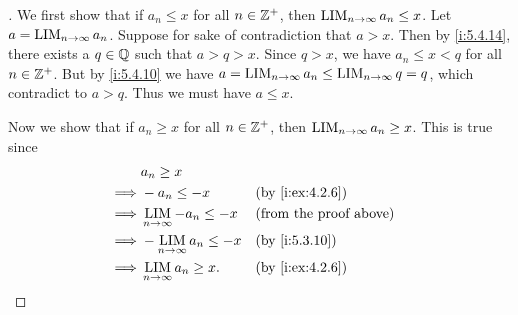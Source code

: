 \begin{proof}[]
  We first show that if \(a_n \leq x\) for all \(n \in \mathbb{Z}^+\), then \(\operatorname*{LIM}_{n \to \infty} a_n \leq x\).
  Let \(a = \operatorname*{LIM}_{n \to \infty} a_n\).
  Suppose for sake of contradiction that \(a > x\).
  Then by \cref{i:5.4.14}, there exists a \(q \in \mathbb{Q}\) such that \(a > q > x\).
  Since \(q > x\), we have \(a_n \leq x < q\) for all \(n \in \mathbb{Z}^+\).
  But by \cref{i:5.4.10} we have \(a = \operatorname*{LIM}_{n \to \infty} a_n \leq \operatorname*{LIM}_{n \to \infty} q = q\), which contradict to \(a > q\).
  Thus we must have \(a \leq x\).

  Now we show that if \(a_n \geq x\) for all \(n \in \mathbb{Z}^+\), then \(\operatorname*{LIM}_{n \to \infty} a_n \geq x\).
  This is true since
  \begin{align*}
             & a_n \geq x                                                          \\
    \implies & -a_n \leq -x                     &  & \by{i:ex:4.2.6}               \\
    \implies & \LIM_{n \to \infty} -a_n \leq -x &  & \text{(from the proof above)} \\
    \implies & -\LIM_{n \to \infty} a_n \leq -x &  & \by{i:5.3.10}                 \\
    \implies & \LIM_{n \to \infty} a_n \geq x.  &  & \by{i:ex:4.2.6}
  \end{align*}
\end{proof}
